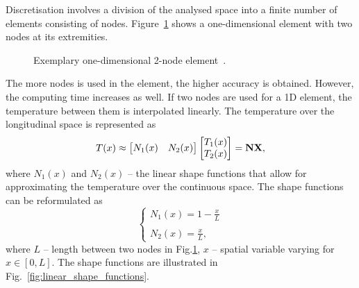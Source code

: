 Discretisation involves a division of the analysed space into a finite number of elements consisting of nodes. Figure~\ref{fig:1d_element} shows a one-dimensional element with two nodes at its extremities. 

\begin{figure}[H]
    \centering
    \caption{Exemplary one-dimensional 2-node element~\cite{eth_introduction_to_finite_element}.}
    \label{fig:1d_element}
\end{figure}

The more nodes is used in the element, the higher accuracy is obtained. However, the computing time increases as well. If two nodes are used for a 1D element, the temperature between them is interpolated linearly. The temperature over the longitudinal space is represented as
\begin{equation}
    T(x) \approx    
    \begin{bmatrix}  
    N_1(x) & N_2(x)    
    \end{bmatrix} 
    \begin{bmatrix}  
    T_1(x) \\  T_2(x) 
    \end{bmatrix} 
    = \textbf{N} \textbf{X}, 
    \label{eqn:linear_shape_function}
\end{equation}
where $N_1(x)$ and $N_2(x)$ -- the linear shape functions that allow for approximating the temperature over the continuous space. The shape functions can be reformulated as 
\begin{equation}
    \left\{ \begin{array}{ lll }
    N_1(x) = 1 - \frac{x}{L} \\ \\
    N_2(x) = \frac{x}{L},
    \end{array} \right.
    \label{eqn:shape_functions_representation}
\end{equation}
where $L$ -- length between two nodes in Fig.\ref{fig:1d_element}, $x$ -- spatial variable varying for $x \in [0, L]$. The shape functions are illustrated in Fig.~\ref{fig:linear_shape_functions}.

